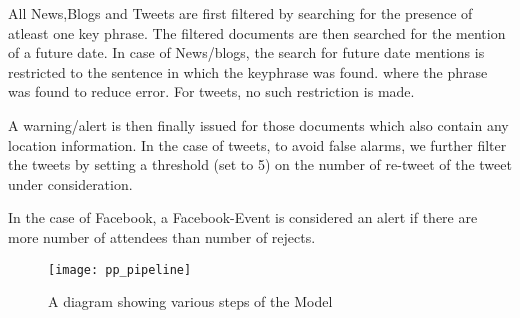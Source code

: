 
All News,Blogs and Tweets are first filtered by searching for the 
presence of atleast one key phrase. The filtered documents are 
then searched for the mention of a future date. In case of News/blogs, 
the search for future date mentions is restricted to the sentence in which the keyphrase was found.
where the phrase was found to reduce error. For tweets, no such restriction is made.

A warning/alert is then finally issued for those documents which also contain any location information.
In the case of tweets, to avoid false alarms, we further filter the tweets by setting a threshold (set to 5) on the number of re-tweet of the tweet under consideration.

In the case of Facebook, a Facebook-Event is considered an alert if there are more number of attendees than number of rejects.

\begin{figure*}
\texttt{[image: pp\_pipeline]}
\caption{A diagram showing various steps of the Model}
\end{figure*}
